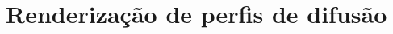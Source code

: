 \documentclass[
    12pt,                %
    oneside,            %
    a4paper,            %
    english,            %
    french,                %
    spanish,            %
    brazil                %
    ]{abntex2}
\begin{document}
%
%
%
%
%
%
%
%
%



\chapter{Renderização de perfis de difusão}
\end{document}
